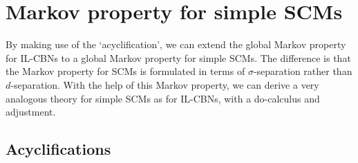 \section{Markov property for simple SCMs}

By making use of the `acyclification', we can extend the global Markov property for IL-CBNs to a global Markov property for simple SCMs.
The difference is that the Markov property for SCMs is formulated in terms of $\sigma$-separation rather than $d$-separation.
With the help of this Markov property, we can derive a very analogous theory for simple SCMs as for IL-CBNs, with a do-calculus and adjustment.

\subsection{Acyclifications}

